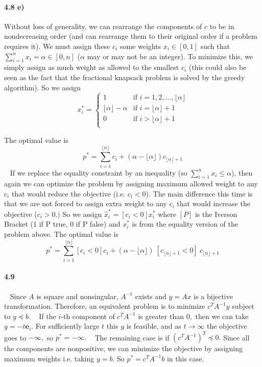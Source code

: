 \documentclass[a4paper,12pt]{article}
\newcommand{\e}{\mathbf{e}}
\begin{document}
\paragraph*{4.8 e)}
Without loss of generality, we can rearrange the components of $c$ to be in nondecreasing order (and can rearrange them to their original order if a problem requires it). We must assign these $c_i$ some weights $x_i\in[0,1]$ such that $\sum_{i=1}^n x_i= \alpha \in [0,n]$ ($\alpha$ may or may not be an integer). To minimize this, we simply assign as much weight as allowed to the smallest $c_i$ (this could also be seen as the fact that the fractional knapsack problem is solved by the greedy algorithm). So we assign 
\[
  x_i^* =
  \begin{cases}
                                   1 & \text{if $i = 1, 2, \ldots, \lfloor \alpha \rfloor$} \\
                                   \lfloor \alpha \rfloor - \alpha & \text{if $i=\lfloor \alpha \rfloor +1$} \\
                                  0 & \text{if $i>\lfloor \alpha \rfloor +1$} \\
  \end{cases}
\]

The optimal value is $$p^* = \sum_{i=1}^{\lfloor \alpha \rfloor} c_i + (\alpha - \lfloor \alpha \rfloor) c_{\lfloor \alpha \rfloor+1}$$
\
\newline
If we replace the equality constraint by an inequality (so $\sum_{i=1}^n x_i \leq \alpha$), then again we can optimize the problem by assigning maximum allowed weight to any $c_i$ that would reduce the objective (i.e. $c_i < 0$). The main difference this time is that we are not forced to assign extra weight to any $c_i$ that would increase the objective ($c_i>0.)$ So we assign $\hat{x}^*_i = [c_i<0] x^*_i$ where $[P]$ is the Iverson Bracket (1 if P true, 0 if P false) and $x^*_i$ is from the equality version of the problem above. The optimal value is 
 $$p^* = \sum_{i=1}^{\lfloor \alpha \rfloor} [c_i<0]c_i + (\alpha - \lfloor \alpha \rfloor) \ [c_{\lfloor \alpha \rfloor+1}<0] \ c_{\lfloor \alpha \rfloor+1}$$
\paragraph*{4.9}
\
\newline
Since $A$ is square and nonsingular, $A^{-1}$ exists and $y=Ax$ is a bijective transformation. Therefore, an equivalent problem is to minimize $c^TA^{-1}y$ subject to $y\preceq b.$
\
\newline
If the $i$-th component of $c^T A^{-1}$ is greater than $0,$ then we can take $y = -t\e_i.$ For sufficiently large $t$ this $y$ is feasible, and as $t\to\infty$ the objective goes to $-\infty,$ so $p^* = -\infty.$ 
\
\newline
The remaining case is if $(c^T A^{-1})^T \preceq 0.$ Since all the components are nonpositive, we can minimize the objective by assigning maximum weights i.e. taking $y = b.$ So $p^* = c^T A^{-1} b$ in this case. 
\end{document}
